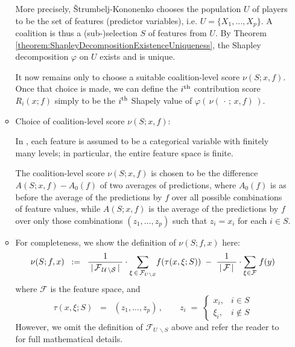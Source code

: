 \begin{itemize}
\begin{itemize}
		More precisely, \v{S}trumbelj-Kononenko \cite{Strumbelj2010}
		chooses the population $U$ of players to be the set of features (predictor variables),
		i.e. $U = \{X_{1},\ldots,X_{p}\}$.
		A coalition is thus a (sub-)selection $S$ of features from $U$.
		By Theorem \ref{theorem:ShapleyDecompositionExistenceUniqueness},
		the Shapley decomposition $\varphi$ on $U$ exists and is unique.

		It now remains only to choose a suitable coalition-level score $\nu(S;x,f)$.
		Once that choice is made, we can define the $i^{\textnormal{th}}$ contribution score
		$R_{i}(x;f)$ simply to be the $i^{\textnormal{th}}$ Shapely value of
		$\varphi\left(\,\nu(\,\cdot\,;\,x,f)\,\right)$.

	\item
		Choice of coalition-level score $\nu(S;x,f)$:
		
		In \cite{Strumbelj2010},
		each feature is assumed to be a categorical variable
		with finitely many levels;
		in particular, the entire feature space is finite.

		
		The coalition-level score $\nu(S;x,f)$ is chosen to be the difference
		$A(S;x,f) - A_{0}(f)$
		of two averages of predictions, where $A_{0}(f)$ is as before
		the average of the predictions by $f$ over all possible combinations of feature values,
		while $A(S;x,f)$ is the average of the predictions by $f$ over only those combinations
		$(z_{1},\ldots,z_{p})$ such that $z_{i} = x_{i}$ for each $i \in S$.

	\item
		For completeness, we show the definition of $\nu(S;f,x)$ here:
		\begin{equation*}
		\nu(S;f,x)
		\;\; := \;\;
			\dfrac{1}{{\color{white}.}\vert\,\mathcal{F_{\,U\,\backslash S}}\,\vert{\color{white}.}}
			\cdot
			\underset{\xi\,\in\,\mathcal{F}_{U \backslash S}}{\sum}f(\tau(x,\xi;S))
			\; - \;
			\dfrac{1}{{\color{white}.}\vert\,\mathcal{F}\,\vert{\color{white}.}}
			\cdot
			\underset{\xi \in \mathcal{F}}{\sum}\;f(y)
		\end{equation*}
		where $\mathcal{F}$ is the feature space, and
		\begin{equation*}
		\tau(x,\xi;S) \;\; = \;\; (z_{1},\ldots,z_{p})\,,
		\quad\quad
		z_{i}
		\; = \;
			\left\{\begin{array}{cl}
			x_{i}, & i \in S
			\\
			\xi_{i}, & i \notin S
			\end{array}\right.
		\end{equation*}
		However, we omit the definition of $\mathcal{F}_{U\,\backslash S}$ above and
		refer the reader to \cite{Strumbelj2010} for full mathematical details.


\end{itemize}
\end{itemize}
